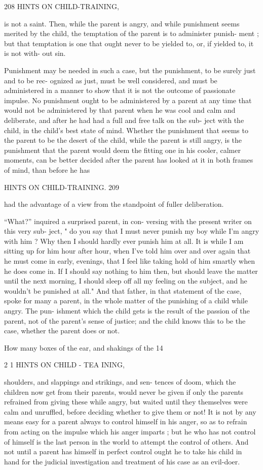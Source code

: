 \documentclass[
]{book}
\begin{document}
208 HINTS ON CHILD-TRAINING,

is not a saint. Then, while the parent is angry, and while punishment seems merited by the child, the temptation of the parent is to administer punish- ment ; but that temptation is one that ought never to be yielded to, or, if yielded to, it is not with- out sin.

Punishment may be needed in such a case, but the punishment, to be surely just and to be rec- ognized as just, must be well considered, and must be administered in a manner to show that it is not the outcome of passionate impulse. No punishment ought to be administered by a parent at any time that would not be administered by that parent when he was cool and calm and deliberate, and after he had had a full and free talk on the sub- ject with the child, in the child's best state of mind. Whether the punishment that seems to the parent to be the desert of the child, while the parent is still angry, is the punishment that the parent would deem the fitting one in his cooler, calmer moments, can be better decided after the parent has looked at it in both frames of mind, than before he has

HINTS ON CHILD-TRAINING. 209

had the advantage of a view from the standpoint of fuller deliberation.

``What?'' inquired a surprised parent, in con- versing with the present writer on this very sub- ject, " do you say that I must never punish my boy while I'm angry with him ? Why then I should hardly ever punish him at all. It is while I am sitting up for him hour after hour, when I've told him over and over again that he must come in early, evenings, that I feel like taking hold of him smartly when he does come in. If I should say nothing to him then, but should leave the matter until the next morning, I should sleep off all my feeling on the subject, and he wouldn't be punished at all." And that father, in that statement of the case, spoke for many a parent, in the whole matter of the punishing of a child while angry. The pun- ishment which the child gets is the result of the passion of the parent, not of the parent's sense of justice; and the child knows this to be the case, whether the parent does or not.

How many boxes of the ear, and shakings of the 14

2 1 HINTS ON CHILD - TEA INING,

shoulders, and slappings and strikings, and sen- tences of doom, which the children now get from their parents, would never be given if only the parents refrained from giving these while angry, but waited until they themselves were calm and unruffled, before deciding whether to give them or not! It is not by any means easy for a parent always to control himself in his anger, so as to refrain from acting on the impulse which his anger imparts ; but he who has not control of himself is the last person in the world to attempt the control of others. And not until a parent has himself in perfect control ought he to take his child in hand for the judicial investigation and treatment of his case as an evil-doer.
\end{document}
